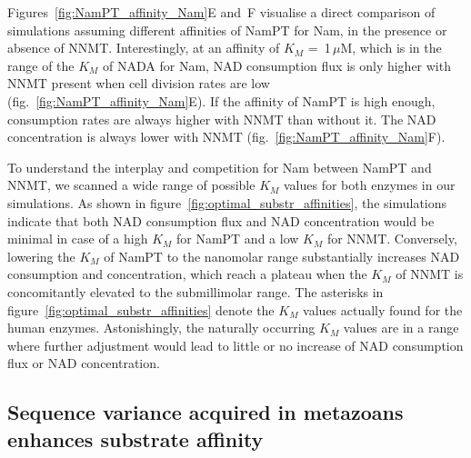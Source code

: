 Figures~\ref{fig:NamPT_affinity_Nam}E and~F visualise a direct comparison of simulations assuming different affinities of NamPT for Nam, in the presence or absence of NNMT. Interestingly, at an affinity of $K_{M}$ =~1\,$\mu$M, which is in the range of the $K_{M}$ of NADA for Nam, NAD consumption flux is only higher with NNMT present when cell division rates are low (fig.~\ref{fig:NamPT_affinity_Nam}E). If the affinity of NamPT is high enough, consumption rates are always higher with NNMT than without it. The NAD concentration is always lower with NNMT (fig.~\ref{fig:NamPT_affinity_Nam}F).

To understand the interplay and competition for Nam between NamPT and NNMT, we scanned a wide range of possible $K_{M}$ values for both enzymes in our simulations. As shown in figure~\ref{fig:optimal_substr_affinities}, the simulations indicate that both NAD consumption flux and NAD concentration would be minimal in case of a high $K_{M}$ for NamPT and a low $K_{M}$ for NNMT. Conversely, lowering the $K_{M}$ of NamPT to the nanomolar range substantially increases NAD consumption and concentration, which reach a plateau when the $K_{M}$ of NNMT is concomitantly elevated to the submillimolar range. The asterisks in figure~\ref{fig:optimal_substr_affinities} denote the $K_{M}$ values actually found for the human enzymes. Astonishingly, the naturally occurring $K_{M}$ values are in a range where further adjustment would lead to little or no increase of NAD consumption flux or NAD concentration.


\subsection{Sequence variance acquired in metazoans enhances substrate affinity}

